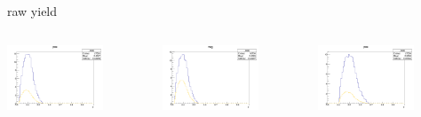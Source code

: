 \begin{frame}{raw yield}
\begin{columns}
\begin{column}[T]{0.25\textwidth}
\includegraphics[width = 0.7\textwidth]{results/yield/statistics/yield_x_Q2_z_0.60_4.775_0.40_pos.png}
\end{column}
\begin{column}[T]{0.25\textwidth}
\includegraphics[width = 0.7\textwidth]{results/yield/statistics/yield_x_Q2_z_0.60_4.775_0.40_neg.png}
\end{column}
\begin{column}[T]{0.25\textwidth}
\includegraphics[width = 0.7\textwidth]{results/yield/statistics/yield_x_Q2_z_0.60_4.775_0.50_pos.png}

\end{column}
\end{columns}
\end{frame}
